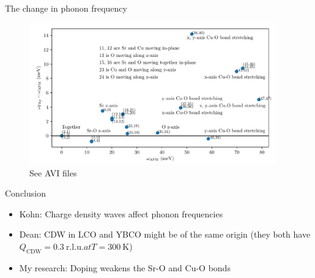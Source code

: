 \documentclass{beamer}
\begin{document}
\begin{frame}{The change in phonon frequency}
\begin{figure}
\includegraphics[width=4.2in]{figs/sco_afm_flip_freq.pdf}
\caption{\label{fig:sco_afm_flip_freq} See AVI files}
\end{figure}
\end{frame}

\begin{frame}{Conclusion}
\begin{itemize}
\item Kohn: Charge density waves affect phonon frequencies
\item Dean: CDW in LCO and YBCO might be of the same origin (they both have $Q_{\text{CDW}} = 0.3~\mathrm{r.l.u.} at T = 300~\mathrm{K}$)
\item My research: Doping weakens the Sr-O and Cu-O bonds
\end{itemize}
\end{frame}
\end{document}
